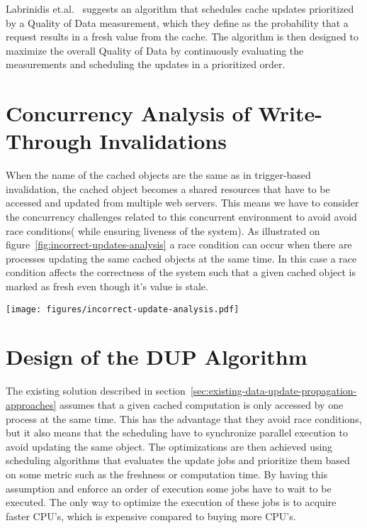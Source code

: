Labrinidis et.al.~\cite{paper:update-propagation-strategies} suggests an algorithm that schedules cache updates prioritized by a Quality of Data measurement, which they define as the probability that a request results in a fresh value from the cache. The algorithm is then designed to maximize the overall Quality of Data by continuously evaluating the measurements and scheduling the updates in a prioritized order.


\section{Concurrency Analysis of Write-Through Invalidations}
\label{sec:race-condition-on-write-through-invalidation}


When the name of the cached objects are the same as in trigger-based invalidation, the cached object becomes a shared resources that have to be accessed and updated from multiple web servers. This means we have to consider the concurrency challenges related to this concurrent environment to avoid avoid race conditions( while ensuring liveness of the system).
As illustrated on figure~\ref{fig:incorrect-updates-analysis} a race condition can occur when there are processes updating the same cached objects at the same time. In this case a race condition affects the correctness of the system such that a given cached object is marked as fresh even though it's value is stale.

\begin{figure*}[ht!]
  \centering
  \texttt{[image: figures/incorrect-update-analysis.pdf]}
  \caption{Showing how two concurrent caching updates from two different application servers results in an inconsistent state. We see that even though the request from \emph{Update Process 2} are based on data older than \emph{Update Process 1} it gets to write }
  \label{fig:incorrect-updates-analysis}
\end{figure*}


\section{Design of the DUP Algorithm}
\label{sec:the-data-update-propagation-algorithm}

The existing solution described in section~\ref{sec:existing-data-update-propagation-approaches} assumes that a given cached computation is only accessed by one process at the same time. This has the advantage that they avoid race conditions, but it also means that the scheduling have to synchronize parallel execution to avoid updating the same object. The optimizations are then achieved using scheduling algorithms that evaluates the update jobs and prioritize them based on some metric such as the freshness or computation time. By having this assumption and enforce an order of execution some jobs have to wait to be executed. The only way to optimize the execution of these jobs is to acquire faster CPU's, which is expensive compared to buying more CPU's.

